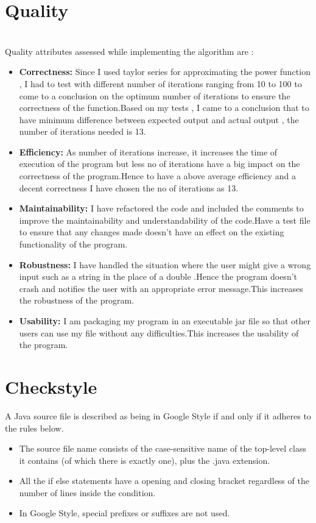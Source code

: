 \documentclass[12pt]{report}
\begin{document}
\section{Quality}
\\
Quality attributes assessed while implementing the algorithm  are :\\
\begin{itemize}
  \item \textbf{Correctness:} Since I used taylor series for approximating the power function , I had to test with different number of iterations ranging from 10 to 100 to come to a conclusion on the optimum number of iterations to ensure the correctness of the function.Based on my tests , I came to a conclusion that to have minimum difference between expected output and actual output , the number of iterations needed is 13.
  \item \textbf{Efficiency:} As number of iterations increase, it increases the time of execution of the program but less no of iterations have a big impact on the correctness of the program.Hence to have a above average efficiency and a decent correctness I have chosen the no of iterations as 13.
  \item \textbf{Maintainability:} I have refactored the code and included the comments to improve the maintainability and understandability of the code.Have a test file to ensure that any changes made doesn't have an effect on the existing functionality of the program.
  \item \textbf{Robustness:} I have handled the situation where the user might give a wrong input such as a string in the place of a double .Hence the program doesn't crash and notifies the user with an appropriate error message.This increases the robustness of the program.
  \item \textbf{Usability:} I am packaging my program in an executable jar file so that other users can use my file without any difficulties.This increases the usability of the program.
\end{itemize}

\newpage
\section{Checkstyle}
A Java source file is described as being in Google Style if and only if it adheres to the rules below.\
\begin{itemize}
\item The source file name consists of the case-sensitive name of the top-level class it contains (of which there is exactly one), plus the .java extension.\
\item All the if else statements have a opening and closing bracket regardless of the  number of lines inside the condition. \
\item In Google Style, special prefixes or suffixes are not used. 
\end{itemize}
\end{document}
